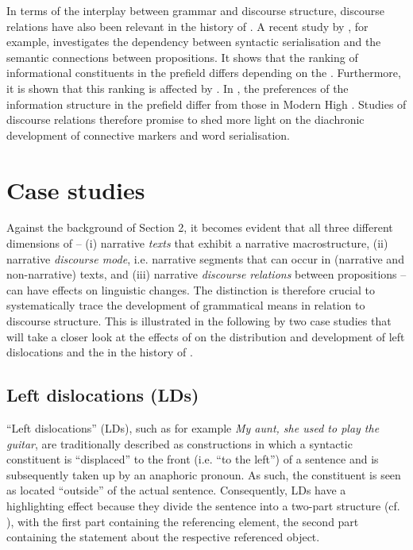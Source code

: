 \documentclass[output=paper,colorlinks,citecolor=brown]{langscibook}
\begin{document}
In terms of the interplay between grammar and discourse structure, discourse relations have also been relevant in the history of . A recent study by \citet{Speyer2022}, for example, investigates the dependency between syntactic serialisation and the semantic connections between propositions. It shows that the ranking of informational constituents in the prefield differs depending on the  \citep[225]{Speyer2022}. Furthermore, it is shown that this ranking is affected by . In , the preferences of the information structure in the prefield differ from those in Modern High  \citep[227]{Speyer2022}. Studies of discourse relations therefore promise to shed more light on the diachronic development of connective markers and word serialisation.


\section{Case studies}\label{sec:zeman:3}

Against the background of Section 2, it becomes evident that all three different dimensions of  – (i) narrative \textit{texts} that exhibit a narrative macrostructure, (ii) narrative \textit{discourse mode}, i.e. narrative segments that can occur in (narrative and non-narrative) texts, and (iii) narrative \textit{discourse relations} between propositions – can have effects on linguistic changes. The distinction is therefore crucial to systematically trace the development of grammatical means in relation to discourse structure. This is illustrated in the following by two case studies that will take a closer look at the effects of  on the distribution and development of left dislocations and the  in the history of .


\subsection{Left dislocations (LDs)}\label{sec:zeman:3.1}
“Left dislocations” (LDs), such as for example \textit{My aunt, she used to play the guitar}, are traditionally described as constructions in which a syntactic constituent is “displaced” to the front (i.e. “to the left”) of a sentence and is subsequently taken up by an anaphoric pronoun. As such, the constituent is seen as located “outside” of the actual sentence. Consequently, LDs have a highlighting effect because they divide the sentence into a two-part structure (cf. \citealt{Bally1932}), with the first part containing the referencing element, the second part containing the statement about the respective referenced object.
\end{document}
